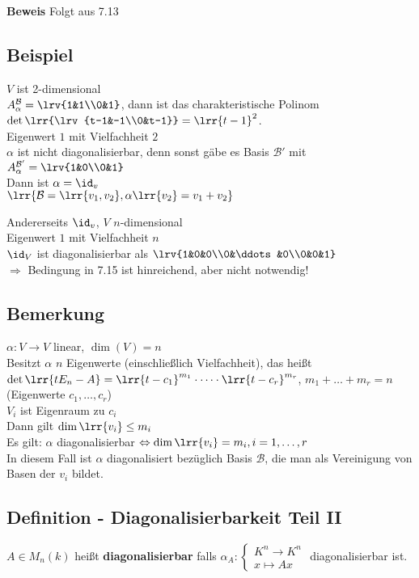 	\textbf{Beweis} Folgt aus 7.13
	
\subsection{Beispiel}
	$V$ ist 2-dimensional\\
	$A_\alpha^\mathcal{B}=\lrv{1&1\\0&1}$, dann ist das charakteristische Polinom $\det\lrr{\lrv{t-1&-1\\0&t-1}}=\lrr{t-1}^2$.\\
	Eigenwert $1$ mit Vielfachheit $2$\\
	$\alpha$ ist nicht diagonalisierbar, denn sonst gäbe es Basis $\mathcal{B}'$ mit $A_\alpha^{\mathcal{B}'}=\lrv{1&0\\0&1}$\\
	Dann ist $\alpha=\id_v$\lightning\\
	$\lrr{\mathcal{B}=\lrr{v_1,v_2},\alpha\lrr{v_2}=v_1+v_2}$
	
	Andererseits $\id_v$, $V$ $n$-dimensional\\
	Eigenwert $1$ mit Vielfachheit $n$\\
	$\id_V$ ist diagonalisierbar als $\lrv{1&0&0\\0&\ddots&0\\0&0&1}$\\
	$\Rightarrow$ Bedingung in 7.15 ist hinreichend, aber nicht notwendig!
	
\subsection{Bemerkung}
	$\alpha:V\rightarrow V$ linear, $\dim(V)=n$\\
	Besitzt $\alpha$ $n$ Eigenwerte (einschließlich Vielfachheit), das heißt $\det\lrr{tE_n-A}=\lrr{t-c_1}^{m_1}\cdot\dots\cdot\lrr{t-c_r}^{m_r}$, $m_1+\dots+m_r=n$ (Eigenwerte $c_1,\dots,c_r$)\\
	$V_i$ ist Eigenraum zu $c_i$\\
	Dann gilt $\dim\lrr{v_i}\leq m_i$\\
	Es gilt: $\alpha$ diagonalisierbar $\Leftrightarrow\dim\lrr{v_i}=m_i, i=1,\dots, r$\\
	In diesem Fall ist $\alpha$ diagonalisiert bezüglich Basis $\mathcal{B}$, die man als Vereinigung von Basen der $v_i$ bildet.
	
\subsection{Definition - Diagonalisierbarkeit Teil II}
	$A\in M_n(k)$ heißt \textbf{diagonalisierbar} falls $\alpha_A:\begin{cases}K^n\rightarrow K^n\\x\mapsto Ax\end{cases}$ diagonalisierbar ist.
	
